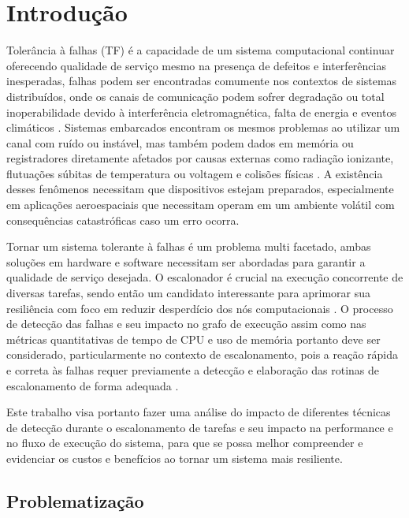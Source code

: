 \chapter{Introdução}
\label{cap:intro}

Tolerância à falhas (TF) é a capacidade de um sistema computacional continuar oferecendo qualidade de serviço mesmo na presença de defeitos e interferências inesperadas, falhas podem ser encontradas comumente nos contextos de sistemas distribuídos, onde os canais de comunicação podem sofrer degradação ou total inoperabilidade devido à interferência eletromagnética, falta de energia e eventos climáticos \cite{FaultTolerantSystems}. Sistemas embarcados encontram os mesmos problemas ao utilizar um canal com ruído ou instável, mas também podem dados em memória ou registradores diretamente afetados por causas externas como radiação ionizante, flutuações súbitas de temperatura ou voltagem e colisões físicas \cite{DependabilityInEmbeddedSystems}. A existência desses fenômenos necessitam que dispositivos estejam preparados, especialmente em aplicações aeroespaciais que necessitam operam em um ambiente volátil com consequências catastróficas caso um erro ocorra.

Tornar um sistema tolerante à falhas é um problema multi facetado, ambas soluções em hardware e software necessitam ser abordadas para garantir a qualidade de serviço desejada. O escalonador é crucial na execução concorrente de diversas tarefas, sendo então um candidato interessante para aprimorar sua resiliência com foco em reduzir desperdício dos nós computacionais \cite{OperatingSystemConcepts}. O processo de detecção das falhas e seu impacto no grafo de execução assim como nas métricas quantitativas de tempo de CPU e uso de memória portanto deve ser considerado, particularmente no contexto de escalonamento, pois a reação rápida e correta às falhas requer previamente a detecção e elaboração das rotinas de escalonamento de forma adequada \cite{DependabilityInEmbeddedSystems}.

Este trabalho visa portanto fazer uma análise do impacto de diferentes técnicas de detecção durante o escalonamento de tarefas e seu impacto na performance e no fluxo de execução do sistema, para que se possa melhor compreender e evidenciar os custos e benefícios ao tornar um sistema mais resiliente. 

\section{Problematização}

